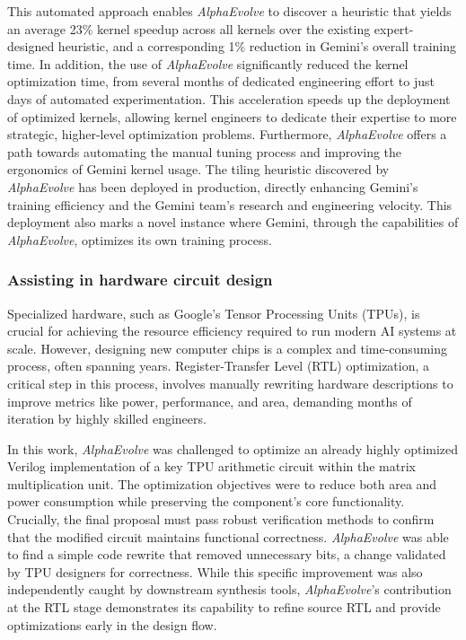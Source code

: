 \documentclass[logo,copyright,12pt]{googledeepmind}
\theoremstyle{definition}
\theoremstyle{remark}
\theoremstyle{plain}
\newcommand{\method}{\emph{AlphaEvolve}\xspace}
\begin{document}
This automated approach enables \method to discover a heuristic that yields an average 23\% kernel speedup across all kernels over the existing expert-designed heuristic, and a corresponding 1\% reduction in Gemini’s overall training time. In addition, the use of \method significantly reduced the kernel optimization time, from several months of dedicated engineering effort to just days of automated experimentation. This acceleration speeds up the deployment of optimized kernels, allowing kernel engineers to dedicate their expertise to more strategic, higher-level optimization problems. Furthermore, \method offers a path towards automating the manual tuning process and improving the ergonomics of Gemini kernel usage. The tiling heuristic discovered by \method has been deployed in production, directly enhancing Gemini's training efficiency and the Gemini team’s research and engineering velocity. This deployment also marks a novel instance where Gemini, through the capabilities of \method, optimizes its own training process.


\subsubsection{Assisting in hardware circuit design}

Specialized hardware, such as Google's Tensor Processing Units (TPUs), is crucial for achieving the resource efficiency required to run modern AI systems at scale. However, designing new computer chips is a complex and time-consuming process, often spanning years. Register-Transfer Level (RTL) optimization, a critical step in this process, involves manually rewriting hardware descriptions to improve metrics like power, performance, and area, demanding months of iteration by highly skilled engineers.

In this work, \method was challenged to optimize an already highly optimized Verilog implementation of a key TPU arithmetic circuit within the matrix multiplication unit. The optimization objectives were to reduce both area and power consumption while preserving the component's core functionality. Crucially, the final proposal must pass robust verification methods to confirm that the modified circuit maintains functional correctness. \method was able to find a simple code rewrite that removed unnecessary bits, a change validated by TPU designers for correctness. While this specific improvement was also independently caught by downstream synthesis tools, \method's contribution at the RTL stage demonstrates its capability to refine source RTL and provide optimizations early in the design flow.
\end{document}
